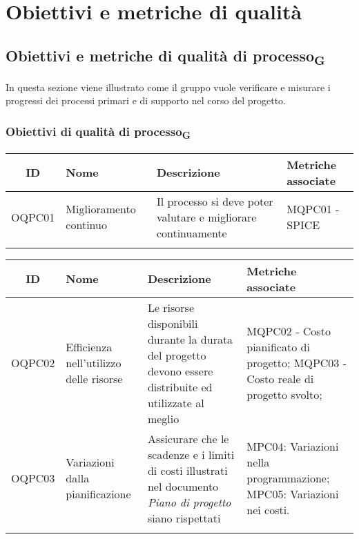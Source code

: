 \section{Obiettivi e metriche di qualità}
\subsection{Obiettivi e metriche di qualità di processo\textsubscript{G}}
In questa sezione viene illustrato come il gruppo vuole verificare e misurare i progressi dei processi primari e di supporto nel corso del progetto. 
\subsubsection{Obiettivi di qualità di processo\textsubscript{G}}
\begin{center}
	\setlength\extrarowheight{5pt}
	\begin{tabularx}{\textwidth}{|c|X|X|X|}
	\hline
	\rowcolor{white}
	\textbf{ID} & \textbf{Nome} & \textbf{Descrizione} & \textbf{Metriche associate}\\
	\hline
	OQPC01 & Miglioramento continuo & Il processo si deve poter valutare e migliorare continuamente & MQPC01 - SPICE\\
	\hline
	\rowcolor{white}
	\caption{Obiettivi di qualità di gestione di processo}
	\end{tabularx}
\end{center}
\begin{center}
	\setlength\extrarowheight{5pt}
	\begin{tabularx}{\textwidth}{|c|X|X|X|}
		\hline
		\rowcolor{white}
		\textbf{ID} & \textbf{Nome} & \textbf{Descrizione} & \textbf{Metriche associate}\\
		\hline
		OQPC02 & Efficienza nell'utilizzo delle risorse & Le risorse disponibili durante la durata del progetto devono essere distribuite ed utilizzate al meglio & MQPC02 - Costo pianificato di progetto; MQPC03 - Costo reale di progetto svolto;\\
		\hline
		OQPC03 & Variazioni dalla pianificazione & Assicurare che le scadenze e i limiti di costi illustrati nel documento \textit{Piano di progetto} siano rispettati &  MPC04: Variazioni nella programmazione;\hspace{65pt} MPC05: Variazioni nei costi. \\
		\hline
		\rowcolor{white}
		\caption{Obiettivi di qualità di processo\textsubscript{G} di pianificazione}
	\end{tabularx}
\end{center}
